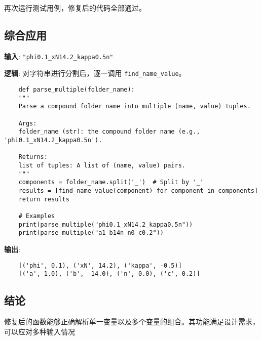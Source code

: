 \documentclass{article}
\begin{document}
再次运行测试用例，修复后的代码全部通过。

\subsection*{综合应用}

\textbf{输入}: \texttt{"phi0.1\_xN14.2\_kappa0.5n"}

\textbf{逻辑}: 对字符串进行分割后，逐一调用 \texttt{find\_name\_value}。

\begin{verbatim}
	def parse_multiple(folder_name):
	"""
	Parse a compound folder name into multiple (name, value) tuples.
	
	Args:
	folder_name (str): the compound folder name (e.g., 'phi0.1_xN14.2_kappa0.5n').
	
	Returns:
	list of tuples: A list of (name, value) pairs.
	"""
	components = folder_name.split('_')  # Split by '_'
	results = [find_name_value(component) for component in components]
	return results
	
	# Examples
	print(parse_multiple("phi0.1_xN14.2_kappa0.5n"))
	print(parse_multiple("a1_b14n_n0_c0.2"))
\end{verbatim}

\textbf{输出}:

\begin{verbatim}
	[('phi', 0.1), ('xN', 14.2), ('kappa', -0.5)]
	[('a', 1.0), ('b', -14.0), ('n', 0.0), ('c', 0.2)]
\end{verbatim}

\subsection*{结论}

修复后的函数能够正确解析单一变量以及多个变量的组合。其功能满足设计需求，可以应对多种输入情况
	
\end{document}
